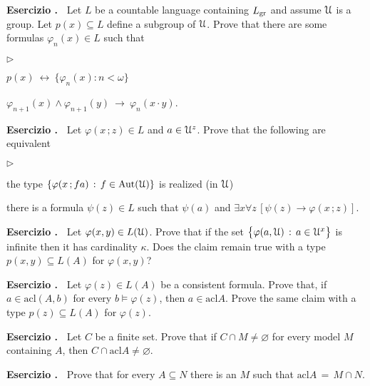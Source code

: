 \documentclass[10pt]{article}
\def\phi{\varphi}
\def\U{\EuScript U}
\def\E{\exists}
\def\A{\forall}
\def\imp{\rightarrow}
\def\iff{\leftrightarrow}
\def\Aut{\textrm{Aut}}
\def\acl{\textrm{acl}}
\newcommand{\labella}[1]{{\sf\footnotesize #1}\hfill}
\renewenvironment{itemize}
  {\begin{list}{$\triangleright$}{%
   \setlength{\parskip}{0mm}
   \setlength{\topsep}{0mm}
   \setlength{\rightmargin}{0mm}
   \setlength{\listparindent}{0mm}
   \setlength{\itemindent}{0mm}
   \setlength{\labelwidth}{3ex}
   \setlength{\itemsep}{0mm}
   \setlength{\parsep}{0mm}
   \setlength{\partopsep}{0mm}
   \setlength{\labelsep}{1ex}
   \setlength{\leftmargin}{\labelwidth+\labelsep}
   \let\makelabel\labella}}{%
  \end{list}}
\newcounter{ex}
\newenvironment{exercise}{\bigskip\addtocounter{ex}{1}\textbf{Esercizio \theex.\ }}{}
\begin{document}
\begin{exercise}
  Let $L$ be a countable language containing $L_{\rm gr}$ and assume $\U$ is a group.
  Let $p(x)\subseteq L$ define a subgroup of $\U$.
  Prove that there are some formulas $\phi_n(x)\in L$ such that 
  \begin{itemize}
  \item[1.] $p(x)\ \iff\ \{\phi_n(x):n<\omega\}$
  \item[2.] $\phi_{n+1}(x)\wedge\phi_{n+1}(y)\ \imp\ \phi_n(x\cdot y)$.
  \end{itemize}
\end{exercise}

\begin{exercise}
  Let $\phi(x\,;z)\in L$ and $a\in\U^z$.
  Prove that the following are equivalent
  \begin{itemize}
  \item[1.] the type $\{\phi(x\,;fa)\,:\,f\in\Aut(\U)\}$ is realized (in $\U$)
  \item[2.] there is a formula $\psi(z)\in L$ such that $\psi(a)$ and $\E x\A z\,[\psi(z)\imp\phi(x\,;z)]$.
  \end{itemize}  
\end{exercise}

\begin{exercise}
  Let $\phi(x,y)\in L(\U)$. Prove that if the set $\big\{\phi(a,\U)\, :\, a\in\U^x\big\}$ is infinite then it has cardinality $\kappa$.
  Does the claim remain true with a type $p(x,y)\subseteq L(A)$ for $\phi(x,y)$?
\end{exercise}

\begin{exercise}
  Let $\phi(z)\in L(A)$ be a consistent formula.
  Prove that, if $a\in\acl(A,b)$ for every $b\models\phi(z)$, then $a\in\acl A$.
  Prove the same claim with a type $p(z)\subseteq L(A)$ for $\phi(z)$.
\end{exercise}

\begin{exercise}
Let $C$ be a finite set.
Prove that if $C\cap M\neq\varnothing$ for every model $M$ containing $A$, then $C\cap\acl A\neq\varnothing$.
\end{exercise}

\begin{exercise}
Prove that for every $A\subseteq N$ there is an $M$ such that $\acl A\,=\,M\cap N$.
\end{exercise} 
\end{document}
